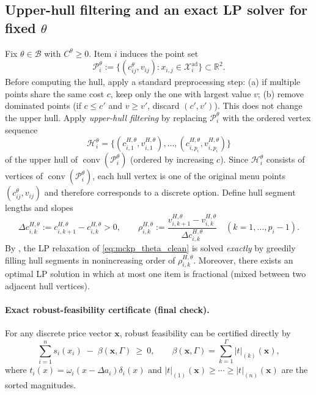 \documentclass[11pt, a4paper]{article}
\theoremstyle{plain}
\theoremstyle{definition}
\theoremstyle{remark}
\begin{document}
\subsection{Upper-hull filtering and an exact LP solver for fixed \texorpdfstring{$\theta$}{theta}}\label{subsec:hull_theta}

Fix $\theta\in\mathcal B$ with $C^\theta\ge 0$. Item $i$ induces the point set
\[
\mathcal P_i^\theta:=\{(c^\theta_{ij},v_{ij}) : x_{i,j}\in\mathcal X_i^{\mathrm{ad}}\}\subset\mathbb R^2.
\]
Before computing the hull, apply a standard preprocessing step: (a) if multiple points share the same cost $c$, keep only the one with
largest value $v$; (b) remove dominated points (if $c\le c'$ and $v\ge v'$, discard $(c',v')$). This does not change the upper hull.
Apply \emph{upper-hull filtering} by replacing $\mathcal P_i^\theta$ with the ordered vertex sequence
\[
\mathcal H_i^\theta=\{(c^{H,\theta}_{i,1},v^{H,\theta}_{i,1}),\dots,(c^{H,\theta}_{i,p_i},v^{H,\theta}_{i,p_i})\}
\]
of the upper hull of $\operatorname{conv}(\mathcal P_i^\theta)$ (ordered by increasing $c$). Since $\mathcal H_i^\theta$ consists of
vertices of $\operatorname{conv}(\mathcal P_i^\theta)$, each hull vertex is one of the original menu points $(c^\theta_{ij},v_{ij})$ and
therefore corresponds to a discrete option.
Define hull segment lengths and slopes
\[
\Delta c^{H,\theta}_{i,k}:=c^{H,\theta}_{i,k+1}-c^{H,\theta}_{i,k}>0,\qquad
\rho^{H,\theta}_{i,k}:=\frac{v^{H,\theta}_{i,k+1}-v^{H,\theta}_{i,k}}{\Delta c^{H,\theta}_{i,k}}
\quad (k=1,\dots,p_i-1).
\]
By , the LP relaxation of \eqref{eq:mckp_theta_clean} is solved \emph{exactly} by greedily filling hull segments in
nonincreasing order of $\rho^{H,\theta}_{i,k}$. Moreover, there exists an optimal LP solution in which at most one item is fractional (mixed
between two adjacent hull vertices).

\paragraph{Exact robust-feasibility certificate (final check).}\label{par:cert}
For any discrete price vector $\bm x$, robust feasibility can be certified directly by
\begin{equation}\label{eq:certify_alg}
\sum_{i=1}^n s_i(x_i)\;-\;\beta(\bm{x},\Gamma)\ \ge\ 0,
\qquad
\beta(\bm{x},\Gamma)=\sum_{k=1}^{\Gamma}|t|_{(k)}(\bm{x}),
\end{equation}
where $t_i(x)=\omega_i(x-\Delta a_i)\delta_i(x)$ and $|t|_{(1)}(\bm{x})\ge\cdots\ge|t|_{(n)}(\bm{x})$ are the sorted magnitudes.
\end{document}
